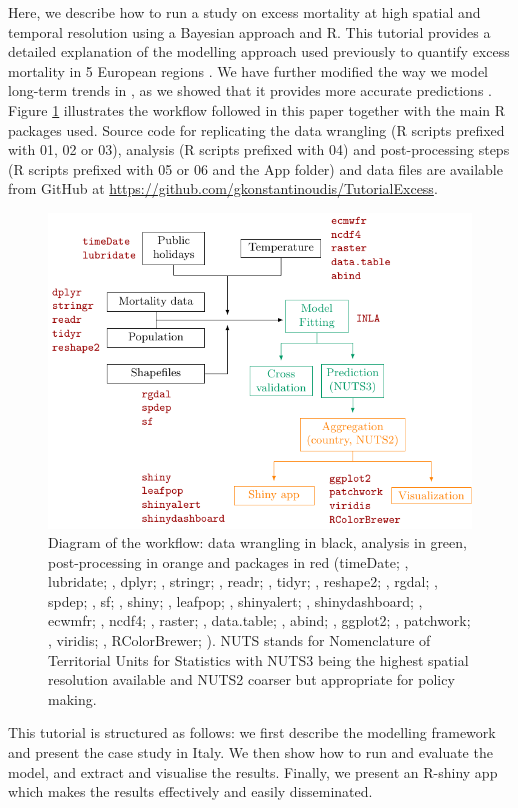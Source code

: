 Here, we describe how to run a study on excess mortality at high spatial and temporal resolution using a Bayesian approach and R. This tutorial provides a detailed explanation of the modelling approach used previously to quantify excess mortality in 5 European regions \citep{konstantinoudis2021regional}. We have further modified the way we model long-term trends in \citet{konstantinoudis2021regional}, as we showed that it provides more accurate predictions \citep{riou2023direct}. Figure \ref{fig:workflow} illustrates the workflow followed in this paper together with the main R packages used. Source code for replicating the data wrangling (R scripts prefixed with 01, 02 or 03), analysis (R scripts prefixed with 04) and post-processing steps (R scripts prefixed with 05 or 06 and the App folder) and data files are available from GitHub at \url{https://github.com/gkonstantinoudis/TutorialExcess}.\\
\begin{figure}[t]
	\centering
	\includegraphics{Workflow.pdf}
	\caption{Diagram of the workflow: data wrangling in black, analysis in green, post-processing in orange and packages in red (timeDate; \citealp{timeDate}, lubridate; \citealp{lubridate}, dplyr; \citealp{dplyr}, stringr; \citealp{stringr}, readr; \citealp{readr}, tidyr; \citealp{tidyr}, reshape2; \citealp{reshape2}, rgdal; \citealp{rgdal}, spdep; \citealp{spdep}, sf; \citealp{sf}, shiny; \citealp{shiny}, leafpop; \citealp{leafpop}, shinyalert; \citealp{shinyalert}, shinydashboard; \citealp{shinydashboard}, ecwmfr; \citealp{ecwmfr}, ncdf4; \citealp{ncdf4}, raster; \citet{raster}, data.table; \citealp{data.table}, abind; \citealp{abind}, ggplot2; \citealp{ggplot2}, patchwork; \citealp{patchwork}, viridis; \citealp{viridis}, RColorBrewer; \citealp{RColorBrewer}). NUTS stands for Nomenclature of Territorial Units for Statistics with NUTS3 being the highest spatial resolution available and NUTS2 coarser but appropriate for policy making.}
	\label{fig:workflow}
\end{figure}
This tutorial is structured as follows: we first describe the modelling framework and present the case study in Italy. We then show how to run and evaluate the model, and extract and visualise the results. Finally, we present an R-shiny app which makes the results effectively and easily disseminated. 




